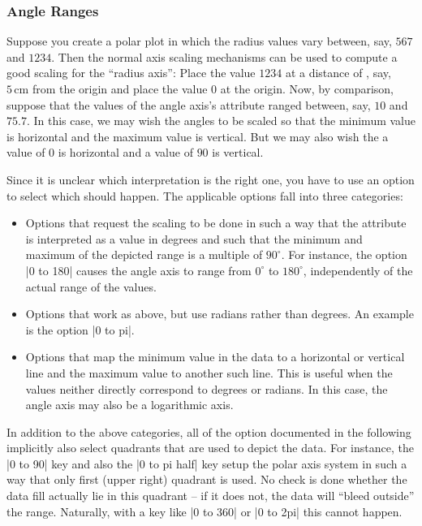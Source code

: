 \subsubsection{Angle Ranges}
\label{section-dv-angle-ranges}

Suppose you create a polar plot in which the radius values vary between, say,
$567$ and $1234$. Then the normal axis scaling mechanisms can be used to
compute a good scaling for the ``radius axis'': Place the value $1234$ at a
distance of , say, $5\,\mathrm{cm}$ from the origin and place the value $0$ at
the origin. Now, by comparison, suppose that the values of the angle axis's
attribute ranged between, say, $10$ and $75.7$. In this case, we may wish the
angles to be scaled so that the minimum value is horizontal and the maximum
value is vertical. But we may also wish the a value of $0$ is horizontal and a
value of $90$ is vertical.

Since it is unclear which interpretation is the right one, you have to use an
option to select which should happen. The applicable options fall into three
categories:
%
\begin{itemize}
    \item Options that request the scaling to be done in such a way that the
        attribute is interpreted as a value in degrees and such that the
        minimum and maximum of the depicted range is a multiple of $90^\circ$.
        For instance, the option |0 to 180| causes the angle axis to range from
        $0^\circ$ to $180^\circ$, independently of the actual range of the
        values.
    \item Options that work as above, but use radians rather than degrees. An
        example is the option |0 to pi|.
    \item Options that map the minimum value in the data to a horizontal or
        vertical line and the maximum value to another such line. This is
        useful when the values neither directly correspond to degrees or
        radians. In this case, the angle axis may also be a logarithmic axis.
\end{itemize}

In addition to the above categories, all of the option documented in the
following implicitly also select quadrants that are used to depict the data.
For instance, the |0 to 90| key and also the |0 to pi half| key setup the polar
axis system in such a way that only first (upper right) quadrant is used. No
check is done whether the data fill actually lie in this quadrant -- if it does
not, the data will ``bleed outside'' the range. Naturally, with a key like
|0 to 360| or |0 to 2pi| this cannot happen.

